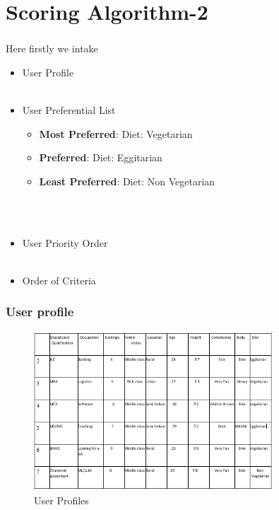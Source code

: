 \documentclass[10pt, compress]{beamer}
\begin{document}
\section{Scoring Algorithm-2}



\begin{frame}[fragile]
  \frametitle{}
   Here firstly we intake 
  \begin{itemize}
	\item<1>User Profile\\~\
	\item<1>User Preferential List
	  \begin{itemize}
	      \item\textbf{ Most Preferred}: Diet: Vegetarian
	      \item\textbf{ Preferred}: Diet: Eggitarian
	      \item\textbf{ Least Preferred}: Diet:  Non Vegetarian
	  \end{itemize}\\~\
	\item<1>User Priority Order\\~\
	\item<1>Order of Criteria

 \end{itemize}
\end{frame}

\begin{frame}[fragile]
  \frametitle{User profile}
   \begin{figure}[h!]
    \centering
    \includegraphics[width=0.8\textwidth]{images/table2.PNG}
    \caption{User Profiles}
    \label{fig:table2}
\end{figure}
\end{frame}
\end{document}
